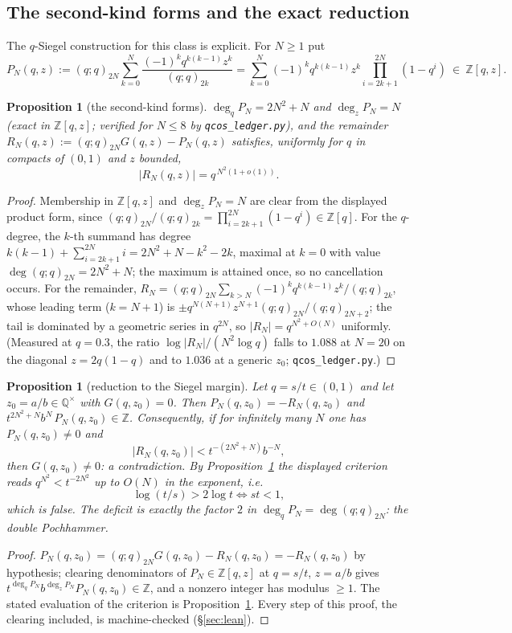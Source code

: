 \documentclass[11pt]{article}
\theoremstyle{plain}
\newtheorem{proposition}[theorem]{Proposition}
\theoremstyle{definition}
\theoremstyle{remark}
\newcommand{\Z}{\mathbb{Z}}
\newcommand{\Q}{\mathbb{Q}}
\begin{document}
\subsection{The second-kind forms and the exact reduction}
The $q$-Siegel construction for this class is explicit. For $N\ge1$ put
\[
   P_N(q,z):=(q;q)_{2N}\sum_{k=0}^{N}\frac{(-1)^kq^{k(k-1)}z^k}{(q;q)_{2k}}
   =\sum_{k=0}^{N}(-1)^kq^{k(k-1)}z^k\!\!\prod_{i=2k+1}^{2N}\!\!(1-q^i)\ \in\ \Z[q,z].
\]
\begin{proposition}[the second-kind forms]\label{prop:secondkind}
$\deg_qP_N=2N^2+N$ and $\deg_zP_N=N$ \textup{(exact in $\Z[q,z]$; verified for $N\le8$ by
\texttt{qcos\_ledger.py})}, and the remainder
$R_N(q,z):=(q;q)_{2N}G(q,z)-P_N(q,z)$ satisfies, uniformly for $q$ in compacts of $(0,1)$ and $z$
bounded,
\[
   |R_N(q,z)|=q^{\,N^2(1+o(1))} .
\]
\end{proposition}
\begin{proof}
Membership in $\Z[q,z]$ and $\deg_zP_N=N$ are clear from the displayed product form, since
$(q;q)_{2N}/(q;q)_{2k}=\prod_{i=2k+1}^{2N}(1-q^i)\in\Z[q]$. For the $q$-degree, the $k$-th summand has
degree $k(k-1)+\sum_{i=2k+1}^{2N}i=2N^2+N-k^2-2k$, maximal at $k=0$ with value
$\deg(q;q)_{2N}=2N^2+N$; the maximum is attained once, so no cancellation occurs. For the remainder,
$R_N=(q;q)_{2N}\sum_{k>N}(-1)^kq^{k(k-1)}z^k/(q;q)_{2k}$, whose leading term ($k=N+1$) is
$\pm q^{N(N+1)}z^{N+1}(q;q)_{2N}/(q;q)_{2N+2}$; the tail is dominated by a geometric series in
$q^{2N}$, so $|R_N|=q^{N^2+O(N)}$ uniformly. \textup{(Measured at $q=0.3$, the ratio
$\log|R_N|/(N^2\log q)$ falls to $1.088$ at $N=20$ on the diagonal $z=2q(1-q)$ and to $1.036$ at a
generic $z_0$; \texttt{qcos\_ledger.py}.)}
\end{proof}

\begin{proposition}[reduction to the Siegel margin]\label{prop:reduction}
Let $q=s/t\in(0,1)$ and let $z_0=a/b\in\Q^\times$ with $G(q,z_0)=0$. Then $P_N(q,z_0)=-R_N(q,z_0)$ and
$t^{2N^2+N}b^N\,P_N(q,z_0)\in\Z$. Consequently, if for infinitely many $N$ one has $P_N(q,z_0)\ne0$ and
\[
   |R_N(q,z_0)|<t^{-(2N^2+N)}b^{-N},
\]
then $G(q,z_0)\ne0$: a contradiction. By Proposition~\ref{prop:secondkind} the displayed criterion
reads $q^{N^2}<t^{-2N^2}$ up to $O(N)$ in the exponent, i.e.
\[
   \log(t/s)>2\log t\iff st<1,
\]
which is false. The deficit is exactly the factor $2$ in $\deg_qP_N=\deg(q;q)_{2N}$: the \emph{double}
Pochhammer.
\end{proposition}
\begin{proof}
$P_N(q,z_0)=(q;q)_{2N}G(q,z_0)-R_N(q,z_0)=-R_N(q,z_0)$ by hypothesis; clearing denominators of
$P_N\in\Z[q,z]$ at $q=s/t$, $z=a/b$ gives $t^{\deg_qP_N}b^{\deg_zP_N}P_N(q,z_0)\in\Z$, and a nonzero
integer has modulus $\ge1$. The stated evaluation of the criterion is
Proposition~\ref{prop:secondkind}. Every step of this proof, the clearing included, is
machine-checked (\S\ref{sec:lean}).
\end{proof}
\end{document}
